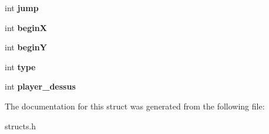 \begin{DoxyCompactItemize}
\item 
\hypertarget{structGameObject_a5a5f7a6c9560282291a6649daa077c73}{int {\bfseries jump}}\label{structGameObject_a5a5f7a6c9560282291a6649daa077c73}

\item 
\hypertarget{structGameObject_a7717372097e015d2c1e66c0a9c29a2b5}{int {\bfseries begin\-X}}\label{structGameObject_a7717372097e015d2c1e66c0a9c29a2b5}

\item 
\hypertarget{structGameObject_af1f65068aa99a128c57de66f037b5dff}{int {\bfseries begin\-Y}}\label{structGameObject_af1f65068aa99a128c57de66f037b5dff}

\item 
\hypertarget{structGameObject_ab8d4ae78808dfe4b284f9df14f85f7b6}{int {\bfseries type}}\label{structGameObject_ab8d4ae78808dfe4b284f9df14f85f7b6}

\item 
\hypertarget{structGameObject_a75805de40f9c8ce1f6e09bf3f0e59673}{int {\bfseries player\-\_\-dessus}}\label{structGameObject_a75805de40f9c8ce1f6e09bf3f0e59673}

\end{DoxyCompactItemize}


The documentation for this struct was generated from the following file\-:\begin{DoxyCompactItemize}
\item 
structs.\-h\end{DoxyCompactItemize}
